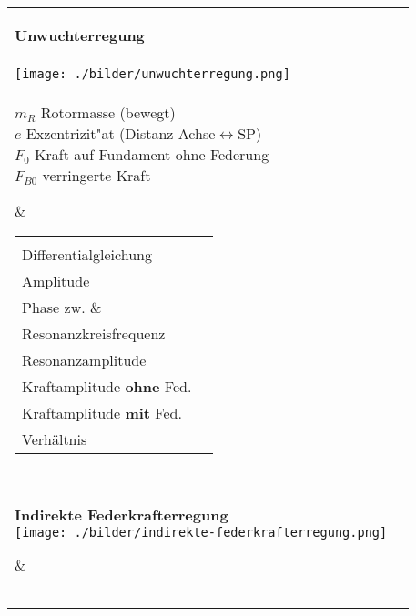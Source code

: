 \begin{tabular}{|l|l|}
\hline
\parbox{6cm}{
	\textbf{Unwuchterregung}\\ \\
	\texttt{[image: ./bilder/unwuchterregung.png]}\\ \\
	$m_R$ Rotormasse (bewegt)\\
	$e$ Exzentrizit"at (Distanz Achse$\leftrightarrow$SP) \\
	$F_0$ Kraft auf Fundament ohne Federung\\
	$F_{B0}$ verringerte Kraft}
	& \begin{minipage}[]{12cm}
      \renewcommand{\arraystretch}{2}
		\begin{tabular}{ll}
        $F(t)=F_0\cdot\sin(\omega t)$
        	& $F_0=m\cdot a_r=m\cdot\dfrac{v^2}{r}=m\cdot r\cdot \omega^2=m_R\cdot e \cdot \omega^2$ \\
    	Differentialgleichung
    		& $m\,\ddot{y}+b\,\dot{y}+c\,y=$
    		\textcolor{blue}{$m_R\,e\,\omega^2\,\sin(\omega t)$} \\
    	Amplitude
    		&
    		$A=\dfrac{m_R\,e\,\omega^2}{m\sqrt{(\omega_0^2-\omega^2)^2+(2D\,\omega_0\,\omega)^2}}$ \\
    	Phase zw. $\omega_0$ \& $\omega$
    		&
    		$\varphi=\operatorname{arctan}\left(\dfrac{2D\,\omega_0\,\omega}{\omega_0^2-\omega}\right)$\\ 
    	Resonanzkreisfrequenz
    		& $\omega_r=\dfrac{\omega_0}{\sqrt{1-2D^2}}$\\
    	Resonanzamplitude
    		& $A_r=\dfrac{m_R}{m}\dfrac{e}{2D\sqrt{1-D^2}}$\\
    	Kraftamplitude \textbf{ohne} Fed.
    		& $F_0 = m_R\,e\,\omega^2 \sin(\omega t)$\\
		Kraftamplitude \textbf{mit} Fed.
    		&
    		$F_{B0}=\dfrac{m_R\,e\,\omega^2\,\sqrt{1+4D^2\eta^2}}{\sqrt{(1-\eta^2)^2+4D^2\eta^2}}=F(\eta)$ \\ 
    	Verhältnis
    		&$\dfrac{F_{B0}}{F_0}=\sqrt{\dfrac{1+4D^2\eta^2}{(1-\eta^2)^2+4D^2\eta^2}}$ \\ 
		\end{tabular}
    \end{minipage} \\
\hline
\parbox{6cm}{
	\textbf{Indirekte Federkrafterregung}\\
	\texttt{[image: ./bilder/indirekte-federkrafterregung.png]}}
	& \begin{minipage}[]{12cm}
      \renewcommand{\arraystretch}{2}
		\begin{tabular}{ll}

\end{tabular}
\end{minipage}
\end{tabular}

